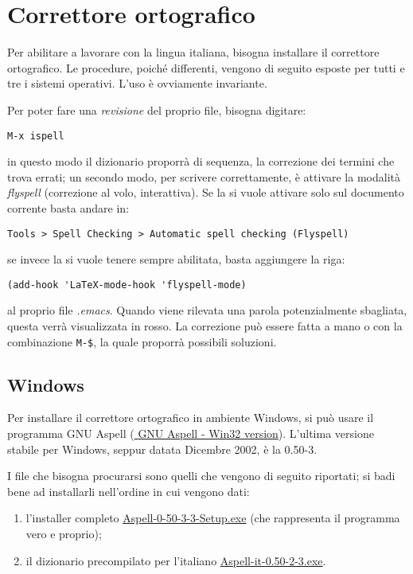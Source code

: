 \documentclass[10pt,a4paper]{article}
\begin{document}
\textcolor{red!50}{\lipsum[1]}

\section{Correttore ortografico}
\label{sec:corr}
Per abilitare \emacs{} a lavorare con la lingua italiana, bisogna
installare il correttore ortografico. Le procedure, poiché differenti,
vengono di seguito esposte per tutti e tre i sistemi operativi. 
L'uso è ovviamente invariante. 

Per poter fare una \emph{revisione} del proprio file, bisogna digitare:
\begin{verbatim}
M-x ispell
\end{verbatim}
in questo modo il dizionario proporrà di sequenza, la correzione
dei termini che trova errati; un secondo modo, per scrivere
correttamente, è attivare la modalità \emph{flyspell} (correzione al
volo, interattiva). Se la si vuole
attivare solo sul documento corrente basta andare in:
\begin{verbatim}
Tools > Spell Checking > Automatic spell checking (Flyspell)
\end{verbatim}
se invece la si vuole tenere sempre abilitata,
basta aggiungere la riga:
\begin{verbatim}
(add-hook 'LaTeX-mode-hook 'flyspell-mode)
\end{verbatim}
al proprio file \emph{.emacs}. Quando viene rilevata una parola
potenzialmente sbagliata, questa verrà visualizzata in rosso. La
correzione può essere fatta a mano o con la combinazione \verb!M-$!,
la quale proporrà possibili soluzioni.

\subsection*{Windows}
\label{sec:aspellwin}
Per installare il correttore ortografico in ambiente
Windows, si può usare il programma \textsf{GNU Aspell}
(\href{http://aspell.net/win32/}{\mano{} \textsf{GNU Aspell - Win32 version}}). L'ultima
versione stabile per Windows, seppur datata Dicembre 2002, è la \textsf{0.50-3}.

I file che bisogna procurarsi sono quelli che vengono di seguito
riportati; si badi bene ad installarli nell'ordine in cui vengono dati:

\begin{enumerate}
\item l'installer completo \href{http://ftp.gnu.org/gnu/aspell/w32/Aspell-0-50-3-3-Setup.exe}%
{\textsf{Aspell-0-50-3-3-Setup.exe}} (che rappresenta il programma
vero e proprio);
\item il dizionario precompilato per l'italiano
\href{http://ftp.gnu.org/gnu/aspell/w32/Aspell-it-0.50-2-3.exe}%
{\textsf{Aspell-it-0.50-2-3.exe}}.
\end{enumerate}
\end{document}
